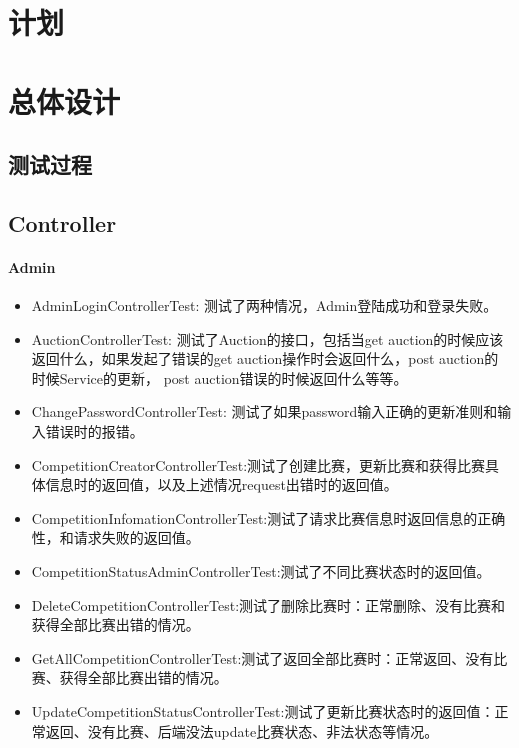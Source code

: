 \documentclass{article}
\begin{document}
		\section{计划}
			\section{总体设计}
				\subsection{测试过程}
					\subsection{Controller}
						\paragraph{Admin}
							\begin{itemize}
							\item AdminLoginControllerTest: 测试了两种情况，Admin登陆成功和登录失败。
							\item AuctionControllerTest: 测试了Auction的接口，包括当get auction的时候应该返回什么，如果发起了错误的get auction操作时会返回什么，post auction的时候Service的更新， post auction错误的时候返回什么等等。
							\item ChangePasswordControllerTest: 测试了如果password输入正确的更新准则和输入错误时的报错。
							\item CompetitionCreatorControllerTest:测试了创建比赛，更新比赛和获得比赛具体信息时的返回值，以及上述情况request出错时的返回值。
							\item CompetitionInfomationControllerTest:测试了请求比赛信息时返回信息的正确性，和请求失败的返回值。
							\item CompetitionStatusAdminControllerTest:测试了不同比赛状态时的返回值。
							\item DeleteCompetitionControllerTest:测试了删除比赛时：正常删除、没有比赛和获得全部比赛出错的情况。
							\item GetAllCompetitionControllerTest:测试了返回全部比赛时：正常返回、没有比赛、获得全部比赛出错的情况。
							\item UpdateCompetitionStatusControllerTest:测试了更新比赛状态时的返回值：正常返回、没有比赛、后端没法update比赛状态、非法状态等情况。
							\end{itemize}
\end{document}
